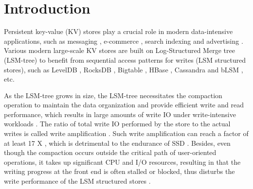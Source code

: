 \documentclass[sigconf]{acmart}
\begin{document}
\section{Introduction}
Persistent key-value (KV) stores play a crucial role in modern data-intensive applications, such as messaging \cite{HH,HBase}, e-commerce \cite{Dynamo}, search indexing \cite{LevelDB, Bigtable} and advertising \cite{RocksDB,PNUTS}. Various modern large-scale KV stores are built on Log-Structured Merge tree (LSM-tree) \cite{LSMtree} to benefit from sequential access patterns for writes (LSM structured stores), such as LevelDB \cite{LevelDB}, RocksDB \cite{RocksDB}, Bigtable \cite{Bigtable}, HBase \cite{HBase}, Cassandra \cite{Cassandra} and bLSM \cite{bLSM}, etc.

As the LSM-tree grows in size, the LSM-tree necessitates the compaction operation to maintain the data organization and provide efficient write and read performance, which results in large amounts of write IO under write-intensive workloads \cite{LevelDB, HyperLevelDB, RocksDB}. The ratio of total write IO performed by the store to the actual writes is called write amplification \cite{LevelDB, PebblesDB}. Such write amplification can reach a factor of at least 17 X \cite{Wisckey,PebblesDB}, which is detrimental to the endurance of SSD \cite{SSD, Wisckey, HashKV}. Besides, even though the compaction occurs outside the critical path of user-oriented operations, it takes up significant CPU and I/O resources, resulting in that the writing progress at the front end is often stalled or blocked, thus disturbs the write performance of the LSM structured stores \cite{TRIAD, PebblesDB}. 
\end{document}
